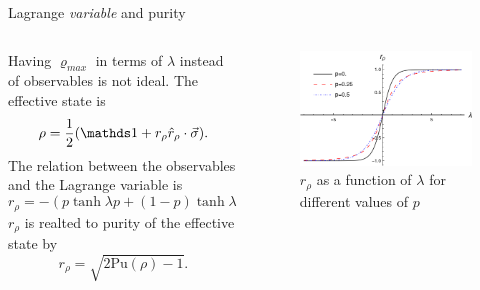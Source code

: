 \begin{frame}{Lagrange \textit{variable} and purity}
    \begin{columns}
        \begin{column}{0.5\textwidth}
            Having $\varrho_{max}$ in terms of $\lambda$ instead of observables is not ideal. The effective state is
            \begin{equation*}
                \rho=\frac{1}{2}(\Id+r_{\rho}\hat{r}_{\rho}\cdot\vec{\sigma}).
            \end{equation*}
            The relation between the observables and the Lagrange variable is
            \begin{equation*}
                r_{\rho}=-(p\tanh{\lambda p}+(1-p)\tanh{\lambda (1-p)}).
            \end{equation*}
            $r_{\rho}$ is realted to purity of the effective state by
            \begin{equation*}
                r_{\rho}=\sqrt{2\text{Pu}(\rho)-1}.
            \end{equation*}
        \end{column}
        \begin{column}{0.5\textwidth}
            \begin{figure}[h!]
                \includegraphics[width=0.8\columnwidth]{../notes/log/maxent/figures/rz(lambda)_lambda-8to8.png}%
                \caption{$r_{\rho}$ as a function of $\lambda$ for different values of $p$}
            \end{figure}
        \end{column}
    \end{columns}
\end{frame}

